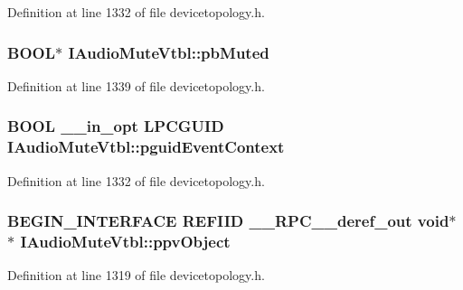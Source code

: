 Definition at line 1332 of file devicetopology.\+h.

\subsubsection[{\texorpdfstring{pb\+Muted}{pbMuted}}]{ {\bf B\+O\+OL}$\ast$ I\+Audio\+Mute\+Vtbl\+::pb\+Muted}\hypertarget{struct_i_audio_mute_vtbl_a27e2e0f40a70e474c6ea0c7163c114a6}{}\label{struct_i_audio_mute_vtbl_a27e2e0f40a70e474c6ea0c7163c114a6}


Definition at line 1339 of file devicetopology.\+h.

\subsubsection[{\texorpdfstring{pguid\+Event\+Context}{pguidEventContext}}]{ {\bf B\+O\+OL} {\bf \+\_\+\+\_\+in\+\_\+opt} {\bf L\+P\+C\+G\+U\+ID} I\+Audio\+Mute\+Vtbl\+::pguid\+Event\+Context}\hypertarget{struct_i_audio_mute_vtbl_aba252a6a1ba148df2a670a3e6bd46dae}{}\label{struct_i_audio_mute_vtbl_aba252a6a1ba148df2a670a3e6bd46dae}


Definition at line 1332 of file devicetopology.\+h.

\subsubsection[{\texorpdfstring{ppv\+Object}{ppvObject}}]{\setlength{\rightskip}{0pt plus 5cm}B\+E\+G\+I\+N\+\_\+\+I\+N\+T\+E\+R\+F\+A\+CE {\bf R\+E\+F\+I\+ID} {\bf \+\_\+\+\_\+\+R\+P\+C\+\_\+\+\_\+deref\+\_\+out} {\bf void}$\ast$$\ast$ I\+Audio\+Mute\+Vtbl\+::ppv\+Object}\hypertarget{struct_i_audio_mute_vtbl_a14258911aafdb755bd1dca317a4ce8b8}{}\label{struct_i_audio_mute_vtbl_a14258911aafdb755bd1dca317a4ce8b8}


Definition at line 1319 of file devicetopology.\+h.

